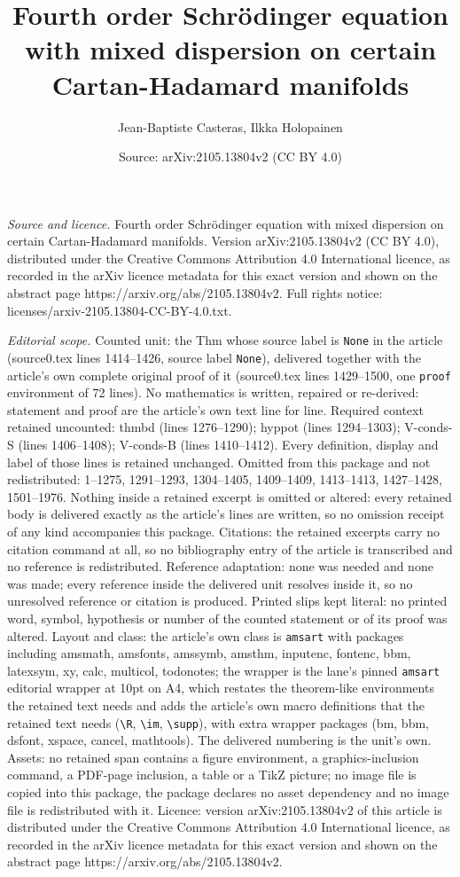 \documentclass[10pt,a4paper]{amsart}
\title[Fourth order Schr\"odinger equation with mixed dispersion on]{Fourth order Schr\"odinger equation with mixed dispersion on certain Cartan-Hadamard manifolds}
\author{Jean-Baptiste Casteras, Ilkka Holopainen}
\date{Source: arXiv:2105.13804v2 (CC BY 4.0)}
\begin{document}
\maketitle

\noindent\emph{Source and licence.} Fourth order Schr\"odinger equation with mixed dispersion on certain Cartan-Hadamard manifolds. Version arXiv:2105.13804v2 (CC BY 4.0), distributed under the Creative Commons Attribution 4.0 International licence, as recorded in the arXiv licence metadata for this exact version and shown on the abstract page https://arxiv.org/abs/2105.13804v2. Full rights notice: licenses/arxiv-2105.13804-CC-BY-4.0.txt.\par\smallskip

\noindent\textit{Editorial scope.} Counted unit: the Thm whose source label is \texttt{None} in the article (source0.tex lines 1414--1426, source label \texttt{None}), delivered together with the article's own complete original proof of it (source0.tex lines 1429--1500, one \texttt{proof} environment of 72 lines). No mathematics is written, repaired or re-derived: statement and proof are the article's own text line for line. Required context retained uncounted: thmbd (lines 1276--1290); hyppot (lines 1294--1303); V-conds-S (lines 1406--1408); V-conds-B (lines 1410--1412). Every definition, display and label of those lines is retained unchanged. Omitted from this package and not redistributed: 1--1275, 1291--1293, 1304--1405, 1409--1409, 1413--1413, 1427--1428, 1501--1976. Nothing inside a retained excerpt is omitted or altered: every retained body is delivered exactly as the article's lines are written, so no omission receipt of any kind accompanies this package. Citations: the retained excerpts carry no citation command at all, so no bibliography entry of the article is transcribed and no reference is redistributed. Reference adaptation: none was needed and none was made; every reference inside the delivered unit resolves inside it, so no unresolved reference or citation is produced. Printed slips kept literal: no printed word, symbol, hypothesis or number of the counted statement or of its proof was altered. Layout and class: the article's own class is \texttt{amsart} with packages including amsmath, amsfonts, amssymb, amsthm, inputenc, fontenc, bbm, latexsym, xy, calc, multicol, todonotes; the wrapper is the lane's pinned \texttt{amsart} editorial wrapper at 10pt on A4, which restates the theorem-like environments the retained text needs and adds the article's own macro definitions that the retained text needs (\texttt{\textbackslash R}, \texttt{\textbackslash im}, \texttt{\textbackslash supp}), with extra wrapper packages (bm, bbm, dsfont, xspace, cancel, mathtools). The delivered numbering is the unit's own. Assets: no retained span contains a figure environment, a graphics-inclusion command, a PDF-page inclusion, a table or a TikZ picture; no image file is copied into this package, the package declares no asset dependency and no image file is redistributed with it. Licence: version arXiv:2105.13804v2 of this article is distributed under the Creative Commons Attribution 4.0 International licence, as recorded in the arXiv licence metadata for this exact version and shown on the abstract page https://arxiv.org/abs/2105.13804v2. 
\end{document}
